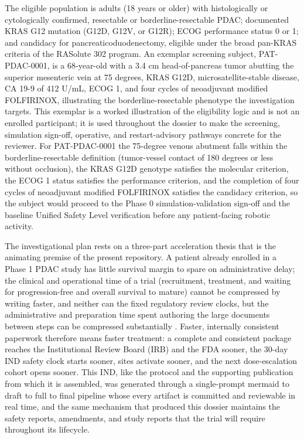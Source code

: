 The eligible population is adults (18 years or older) with histologically or
cytologically confirmed, resectable or borderline-resectable PDAC; documented KRAS
G12 mutation (G12D, G12V, or G12R); ECOG performance status 0 or 1; and candidacy
for pancreaticoduodenectomy, eligible under the broad pan-KRAS criteria of the
RASolute 302 program. An exemplar screening subject, PAT-PDAC-0001, is a 68-year-old
with a 3.4 cm head-of-pancreas tumor abutting the superior mesenteric vein at 75
degrees, KRAS G12D, microsatellite-stable disease, CA 19-9 of 412 U/mL, ECOG 1, and
four cycles of neoadjuvant modified FOLFIRINOX, illustrating the borderline-resectable
phenotype the investigation targets. This exemplar is a worked illustration of the
eligibility logic and is not an enrolled participant; it is used throughout the
dossier to make the screening, simulation sign-off, operative, and restart-advisory
pathways concrete for the reviewer. For PAT-PDAC-0001 the 75-degree venous abutment
falls within the borderline-resectable definition (tumor-vessel contact of 180
degrees or less without occlusion), the KRAS G12D genotype satisfies the molecular
criterion, the ECOG 1 status satisfies the performance criterion, and the
completion of four cycles of neoadjuvant modified FOLFIRINOX satisfies the
candidacy criterion, so the subject would proceed to the Phase 0 simulation-validation
sign-off and the baseline Unified Safety Level verification before any
patient-facing robotic activity.

The investigational plan rests on a three-part acceleration thesis that is the
animating premise of the present repository. A patient already enrolled in a Phase
1 PDAC study has little survival margin to spare on administrative delay; the
clinical and operational time of a trial (recruitment, treatment, and waiting for
progression-free and overall survival to mature) cannot be compressed by writing
faster, and neither can the fixed regulatory review clocks, but the administrative
and preparation time spent authoring the large documents between steps can be
compressed substantially \cite{oncotrialllm, paipredict4x}. Faster, internally
consistent paperwork therefore means faster treatment: a complete and consistent
package reaches the Institutional Review Board (IRB) and the FDA sooner, the 30-day
IND safety clock starts sooner, sites activate sooner, and the next dose-escalation
cohort opens sooner. This IND, like the protocol and the supporting publication
from which it is assembled, was generated through a single-prompt mermaid to draft
to full to final pipeline whose every artifact is committed and reviewable in real
time, and the same mechanism that produced this dossier maintains the safety
reports, amendments, and study reports that the trial will require throughout its
lifecycle.

